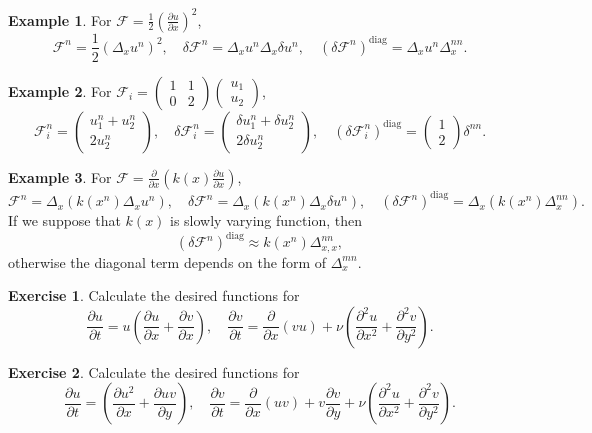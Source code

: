 \documentclass{article}
\newcommand{\pert}[1]{\delta#1}
\newcommand{\pder}[2][]{\frac{\partial#1}{\partial#2}}      %
\newcommand{\dder}[1]{\Delta_{#1}}                          %
\newcommand{\pderdual}[2][]{\frac{\partial^2#1}{\partial#2^2}}
\newcommand{\FF}{\mathcal{F}}
\newcommand{\diag}[1]{\left(#1\right)^\mathrm{diag}}
\newcommand{\matr}[4]{\begin{pmatrix} #1 & #2\\#3 & #4\end{pmatrix}}
\newcommand{\vect}[2]{\begin{pmatrix} #1\\#2\end{pmatrix}}
\theoremstyle{definition}
\newtheorem{example}{Example}
\newtheorem{exercise}{Exercise}
\begin{document}
\begin{example}
    For \(\FF = \frac12\left(\pder[u]{x}\right)^2\), \[
        \FF^n = \frac12\left(\dder{x}u^n\right)^2, \quad
        \pert{\FF^n} = \dder{x}u^n\dder{x}\pert{u^n}, \quad
        \diag{\pert{\FF^n}} = \dder{x}u^n\dder{x}^{nn}.
    \]
\end{example}
\begin{example}
    For \(\FF_i = \matr1102\vect{u_1}{u_2}\), \[
        \FF_i^n = \vect{u_1^n+u_2^n}{2u_2^n}, \quad
        \pert{\FF_i^n} = \vect{\pert{u_1^n}+\pert{u_2^n}}{2\pert{u_2^n}}, \quad
        \diag{\pert{\FF_i^n}} = \vect{1}{2}\delta^{nn}.
    \]
\end{example}
\begin{example}
    For \(\FF = \pder{x}\left( k(x)\pder[u]{x} \right)\), \[
        \FF^n = \dder{x}\left(k(x^n)\dder{x}u^n\right), \quad
        \pert{\FF^n} = \dder{x}\left(k(x^n)\dder{x}\pert{u^n}\right), \quad
        \diag{\pert{\FF^n}} = \dder{x}(k(x^n)\dder{x}^{nn}).
    \]
    If we suppose that \(k(x)\) is slowly varying function, then \[
        \diag{\pert{\FF^n}} \approx k(x^n)\dder{x,x}^{nn},
    \]
    otherwise the diagonal term depends on the form of \(\dder{x}^{mn}\).
\end{example}

\begin{exercise}
    Calculate the desired functions for \[
        \pder[u]{t} = u\left(\pder[u]{x} + \pder[v]{x}\right), \quad
        \pder[v]{t} = \pder{x}(vu) + \nu\left(\pderdual[u]{x}+\pderdual[v]{y}\right).
    \]
\end{exercise}
\begin{exercise}
    Calculate the desired functions for \[
        \pder[u]{t} = \left(\pder[u^2]{x} + \pder[uv]{y}\right), \quad
        \pder[v]{t} = \pder{x}(uv) + v \pder[v]{y} + \nu\left(\pderdual[u]{x}+\pderdual[v]{y}\right).
    \]
\end{exercise}
\end{document}
